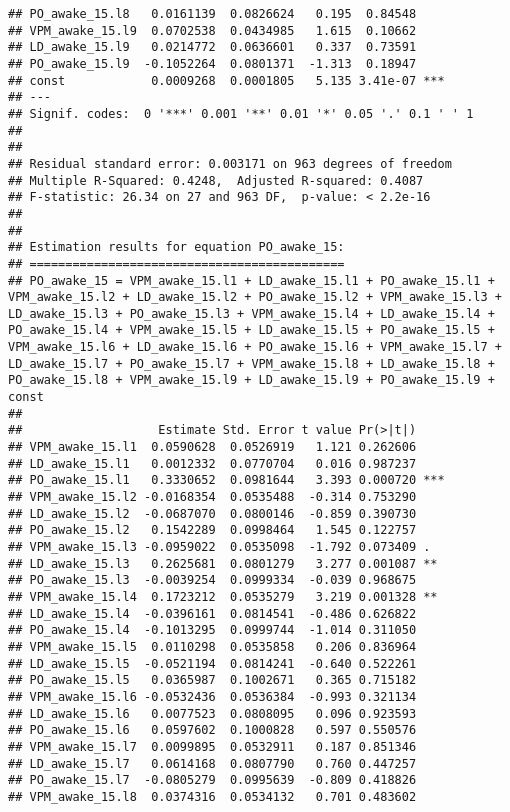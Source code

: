 \documentclass[
]{article}
\begin{document}
\begin{verbatim}
## PO_awake_15.l8   0.0161139  0.0826624   0.195  0.84548    
## VPM_awake_15.l9  0.0702538  0.0434985   1.615  0.10662    
## LD_awake_15.l9   0.0214772  0.0636601   0.337  0.73591    
## PO_awake_15.l9  -0.1052264  0.0801371  -1.313  0.18947    
## const            0.0009268  0.0001805   5.135 3.41e-07 ***
## ---
## Signif. codes:  0 '***' 0.001 '**' 0.01 '*' 0.05 '.' 0.1 ' ' 1
## 
## 
## Residual standard error: 0.003171 on 963 degrees of freedom
## Multiple R-Squared: 0.4248,  Adjusted R-squared: 0.4087 
## F-statistic: 26.34 on 27 and 963 DF,  p-value: < 2.2e-16 
## 
## 
## Estimation results for equation PO_awake_15: 
## ============================================ 
## PO_awake_15 = VPM_awake_15.l1 + LD_awake_15.l1 + PO_awake_15.l1 + VPM_awake_15.l2 + LD_awake_15.l2 + PO_awake_15.l2 + VPM_awake_15.l3 + LD_awake_15.l3 + PO_awake_15.l3 + VPM_awake_15.l4 + LD_awake_15.l4 + PO_awake_15.l4 + VPM_awake_15.l5 + LD_awake_15.l5 + PO_awake_15.l5 + VPM_awake_15.l6 + LD_awake_15.l6 + PO_awake_15.l6 + VPM_awake_15.l7 + LD_awake_15.l7 + PO_awake_15.l7 + VPM_awake_15.l8 + LD_awake_15.l8 + PO_awake_15.l8 + VPM_awake_15.l9 + LD_awake_15.l9 + PO_awake_15.l9 + const 
## 
##                   Estimate Std. Error t value Pr(>|t|)    
## VPM_awake_15.l1  0.0590628  0.0526919   1.121 0.262606    
## LD_awake_15.l1   0.0012332  0.0770704   0.016 0.987237    
## PO_awake_15.l1   0.3330652  0.0981644   3.393 0.000720 ***
## VPM_awake_15.l2 -0.0168354  0.0535488  -0.314 0.753290    
## LD_awake_15.l2  -0.0687070  0.0800146  -0.859 0.390730    
## PO_awake_15.l2   0.1542289  0.0998464   1.545 0.122757    
## VPM_awake_15.l3 -0.0959022  0.0535098  -1.792 0.073409 .  
## LD_awake_15.l3   0.2625681  0.0801279   3.277 0.001087 ** 
## PO_awake_15.l3  -0.0039254  0.0999334  -0.039 0.968675    
## VPM_awake_15.l4  0.1723212  0.0535279   3.219 0.001328 ** 
## LD_awake_15.l4  -0.0396161  0.0814541  -0.486 0.626822    
## PO_awake_15.l4  -0.1013295  0.0999744  -1.014 0.311050    
## VPM_awake_15.l5  0.0110298  0.0535858   0.206 0.836964    
## LD_awake_15.l5  -0.0521194  0.0814241  -0.640 0.522261    
## PO_awake_15.l5   0.0365987  0.1002671   0.365 0.715182    
## VPM_awake_15.l6 -0.0532436  0.0536384  -0.993 0.321134    
## LD_awake_15.l6   0.0077523  0.0808095   0.096 0.923593    
## PO_awake_15.l6   0.0597602  0.1000828   0.597 0.550576    
## VPM_awake_15.l7  0.0099895  0.0532911   0.187 0.851346    
## LD_awake_15.l7   0.0614168  0.0807790   0.760 0.447257    
## PO_awake_15.l7  -0.0805279  0.0995639  -0.809 0.418826    
## VPM_awake_15.l8  0.0374316  0.0534132   0.701 0.483602    

\end{verbatim}
\end{document}
